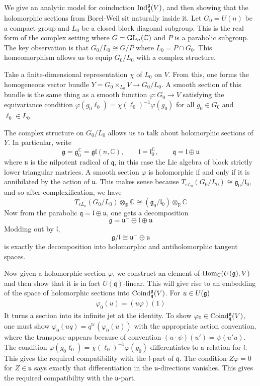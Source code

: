 \documentclass[12pt]{article}
\begin{document}
\begin{example}
    We give an analytic model for coinduction $\operatorname{Ind}_{\mathfrak q}^{\mathfrak g}(V)$, and then showing that the holomorphic sections from Borel-Weil sit naturally inside it. Let $G_0 = U(n)$ be a compact group and $L_0$ be a closed block diagonal subgroup. This is the real form of the complex setting where $G = \operatorname{GL}_n(\mathbb{C})$ and $P$ is a parabolic subgroup. The key observation is that $G_0/L_0 \cong G/P$ where $L_0 = P \cap G_0$. This homeomorphism allows us to equip $G_0/L_0$ with a complex structure. 

    Take a finite-dimensional representation $\chi$ of $L_0$ on $V$. From this, one forms the homogeneous vector bundle
$Y=G_0\times_{L_0}V \to G_0/L_0$. A smooth section of this bundle is the same thing as a smooth function
$\varphi:G_0\to V$
satisfying the equivariance condition
$\varphi(g_0\ell_0)=\chi(\ell_0)^{-1}\varphi(g_0)$
for all $g_0\in G_0$ and $\ell_0\in L_0$.

The complex structure on $G_0/L_0$ allows us to talk about holomorphic sections of $Y$. In particular, write \[\mathfrak g=\mathfrak g_0^{\mathbb C}=\mathfrak{gl}(n,\mathbb C),
\qquad
\mathfrak l=\mathfrak l_0^{\mathbb C},
\qquad
\mathfrak q=\mathfrak l\oplus \mathfrak u\]
where $\mathfrak u$ is the nilpotent radical of $\mathfrak q$, in this case the Lie algebra of block strictly lower triangular matrices. A smooth section $\varphi$ is holomorphic if and only if it is annihilated by the action of $\mathfrak u$. This makes sense because 
$T_{eL_0}(G_0/L_0)\cong \mathfrak g_0/\mathfrak l_0$, and so after complexification, we have
\[T_{eL_0}(G_0/L_0)\otimes_{\mathbb R}\mathbb C
\cong
(\mathfrak g_0/\mathfrak l_0)\otimes_{\mathbb R}\mathbb C\] Now from the parabolic $\mathfrak q=\mathfrak l\oplus \mathfrak u$, one gets a decomposition
\[\mathfrak g=\mathfrak u^- \oplus \mathfrak l \oplus \mathfrak u\] Modding out by $\mathfrak l$,
\[\mathfrak g/\mathfrak l \cong \mathfrak u^- \oplus \mathfrak u\] is exactly the decomposition into holomorphic and antiholomorphic tangent spaces.

Now given a holomorphic section $\varphi$, we construct an element of $\operatorname{Hom}_{\mathbb{C}}(U(\mathfrak g),V)$ and then show that it is in fact $U(\mathfrak q)$-linear. This will give rise to an embedding of the space of holomorphic sections into $\operatorname{Coind}_{\mathfrak q}^{\mathfrak g}(V)$. For $u\in U(\mathfrak{g})$ \begin{align*}
    \varphi_0(u)=(u\varphi)(1)
\end{align*} It turns a section into its infinite jet at the identity. To show $\varphi_0\in \operatorname{Coind}_{\mathfrak q}^{\mathfrak g}(V)$, one must show
$\varphi_0(uq)=q^{\mathrm{tr}}(\varphi_0(u))$
with the appropriate action convention, where the transpose appears because of convention
$(u\cdot \psi)(u')=\psi(u'u)$. The condition
$\varphi(g_0\ell_0)=\chi(\ell_0)^{-1}\varphi(g_0)$
differentiates to a relation for $\mathfrak l$. This gives the required compatibility with the $\mathfrak l$-part of $\mathfrak q$. The condition
$Z\varphi=0$ for $Z\in \mathfrak u$
says exactly that differentiation in the $\mathfrak u$-directions vanishes. This gives the required compatibility with the $\mathfrak u$-part.


\end{example}
\end{document}
